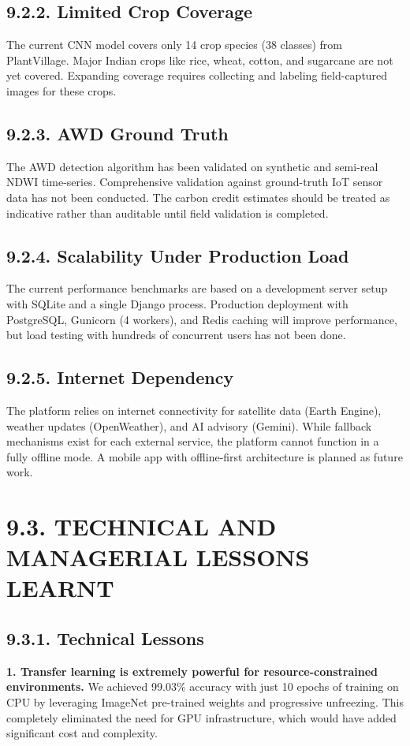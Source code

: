 \documentclass[12pt, a4paper]{report}
\begin{document}
\subsection{9.2.2. Limited Crop Coverage}
The current CNN model covers only 14 crop species (38 classes) from PlantVillage. Major Indian crops like rice, wheat, cotton, and sugarcane are not yet covered. Expanding coverage requires collecting and labeling field-captured images for these crops.

\subsection{9.2.3. AWD Ground Truth}
The AWD detection algorithm has been validated on synthetic and semi-real NDWI time-series. Comprehensive validation against ground-truth IoT sensor data has not been conducted. The carbon credit estimates should be treated as indicative rather than auditable until field validation is completed.

\subsection{9.2.4. Scalability Under Production Load}
The current performance benchmarks are based on a development server setup with SQLite and a single Django process. Production deployment with PostgreSQL, Gunicorn (4 workers), and Redis caching will improve performance, but load testing with hundreds of concurrent users has not been done.

\subsection{9.2.5. Internet Dependency}
The platform relies on internet connectivity for satellite data (Earth Engine), weather updates (OpenWeather), and AI advisory (Gemini). While fallback mechanisms exist for each external service, the platform cannot function in a fully offline mode. A mobile app with offline-first architecture is planned as future work.

\section{9.3. TECHNICAL AND MANAGERIAL LESSONS LEARNT}
\subsection{9.3.1. Technical Lessons}
\textbf{1. Transfer learning is extremely powerful for resource-constrained environments.} We achieved 99.03\% accuracy with just 10 epochs of training on CPU by leveraging ImageNet pre-trained weights and progressive unfreezing. This completely eliminated the need for GPU infrastructure, which would have added significant cost and complexity.
\end{document}
